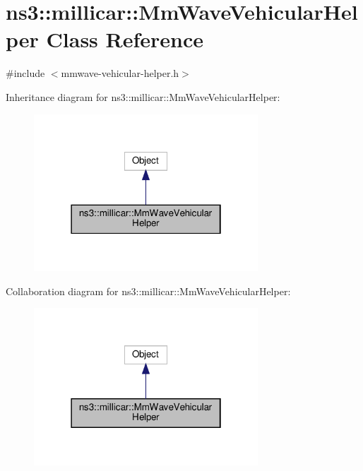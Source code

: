 \hypertarget{classns3_1_1millicar_1_1MmWaveVehicularHelper}{}\section{ns3\+:\+:millicar\+:\+:Mm\+Wave\+Vehicular\+Helper Class Reference}
\label{classns3_1_1millicar_1_1MmWaveVehicularHelper}


{\ttfamily \#include $<$mmwave-\/vehicular-\/helper.\+h$>$}



Inheritance diagram for ns3\+:\+:millicar\+:\+:Mm\+Wave\+Vehicular\+Helper\+:
\nopagebreak
\begin{figure}[H]
\begin{center}
\leavevmode
\includegraphics[width=238pt]{classns3_1_1millicar_1_1MmWaveVehicularHelper__inherit__graph}
\end{center}
\end{figure}


Collaboration diagram for ns3\+:\+:millicar\+:\+:Mm\+Wave\+Vehicular\+Helper\+:
\nopagebreak
\begin{figure}[H]
\begin{center}
\leavevmode
\includegraphics[width=238pt]{classns3_1_1millicar_1_1MmWaveVehicularHelper__coll__graph}
\end{center}
\end{figure}
